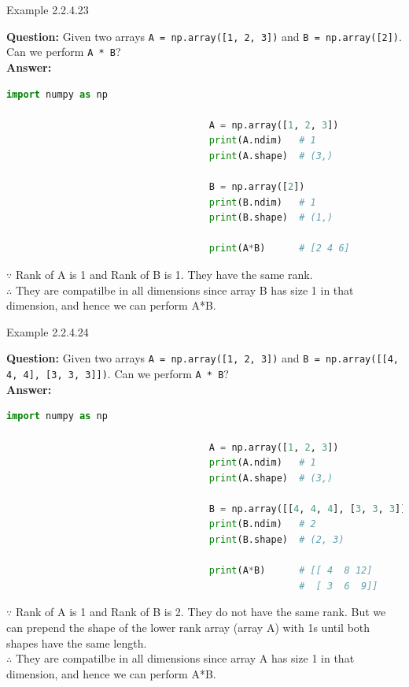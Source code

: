 \documentclass{book}
\begin{document}
\begin{egBox}{Example 2.2.4.23}{}
    \raggedright
    \textbf{Question:} Given two arrays \texttt{A = np.array([1, 2, 3])} and \texttt{B = np.array([2])}. Can we perform \texttt{A * B}? \\
    
    \textbf{Answer:} \\
    
    \begin{lstlisting}[language=Python, basicstyle=\ttfamily\small, keywordstyle=\color{blue}, commentstyle=\color{forestgreen}, stringstyle=\color{red}, showstringspaces=false]
                                    import numpy as np

                                    A = np.array([1, 2, 3])
                                    print(A.ndim)   # 1
                                    print(A.shape)  # (3,)

                                    B = np.array([2])
                                    print(B.ndim)   # 1
                                    print(B.shape)  # (1,)

                                    print(A*B)      # [2 4 6]
    \end{lstlisting}
    $\because$ Rank of A is 1 and Rank of B is 1. They have the same rank.\\
    $\therefore$ They are compatilbe in all dimensions since array B has size 1 in that dimension, and hence we can perform A*B.
\end{egBox}
\begin{egBox}{Example 2.2.4.24}{}
    \raggedright
    \textbf{Question:} Given two arrays \texttt{A = np.array([1, 2, 3])} and \texttt{B = np.array([[4, 4, 4], [3, 3, 3]])}. Can we perform \texttt{A * B}? \\
    \textbf{Answer:} \\
    \begin{lstlisting}[language=Python, basicstyle=\ttfamily\small, keywordstyle=\color{blue}, commentstyle=\color{forestgreen}, stringstyle=\color{red}, showstringspaces=false]
                                    import numpy as np

                                    A = np.array([1, 2, 3])
                                    print(A.ndim)   # 1
                                    print(A.shape)  # (3,)

                                    B = np.array([[4, 4, 4], [3, 3, 3]])
                                    print(B.ndim)   # 2
                                    print(B.shape)  # (2, 3)

                                    print(A*B)      # [[ 4  8 12]
                                                    #  [ 3  6  9]]
    \end{lstlisting}
    $\because$ Rank of A is 1 and Rank of B is 2. They do not have the same rank. But we can prepend the shape of the lower rank array (array A) with 1s until both shapes have the same length.\\
    $\therefore$ They are compatilbe in all dimensions since array A has size 1 in that dimension, and hence we can perform A*B.
\end{egBox}
\end{document}
